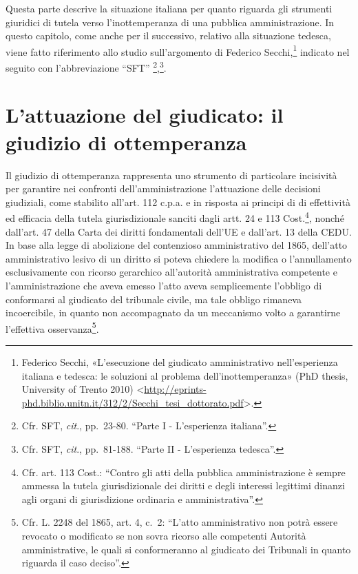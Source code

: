 \documentclass[12pt,it,a4paper,]{report}
\begin{document}
Questa parte descrive la situazione italiana per quanto riguarda gli
strumenti giuridici di tutela verso l'inottemperanza di una pubblica
amministrazione. In questo capitolo, come anche per il successivo,
relativo alla situazione tedesca, viene fatto riferimento allo studio
sull'argomento di Federico Secchi,\footnote{Federico Secchi,
  {«L'esecuzione del giudicato amministrativo nell'esperienza italiana e
  tedesca: le soluzioni al problema dell'inottemperanza»} (PhD thesis,
  University of Trento 2010)
  \textless{}\url{http://eprints-phd.biblio.unitn.it/312/2/Secchi_tesi_dottorato.pdf}\textgreater.}
indicato nel seguito con l'abbreviazione ``SFT''
\footnote{Cfr. SFT, \emph{cit}., pp.~23-80. ``Parte I - L'esperienza
  italiana''.},\footnote{Cfr. SFT, \emph{cit}., pp.~81-188. ``Parte II -
  L'esperienza tedesca''.}.

\hypertarget{lattuazione-del-giudicato-il-giudizio-di-ottemperanza}{%
\section{L'attuazione del giudicato: il giudizio di
ottemperanza}\label{lattuazione-del-giudicato-il-giudizio-di-ottemperanza}}

Il giudizio di ottemperanza rappresenta uno strumento di particolare
incisività per garantire nei confronti dell'amministrazione l'attuazione
delle decisioni giudiziali, come stabilito all'art. 112 c.p.a. e in
risposta ai principi di di effettività ed efficacia della tutela
giurisdizionale sanciti dagli artt. 24 e 113 Cost.\footnote{Cfr. art.
  113 Cost.: ``Contro gli atti della pubblica amministrazione è sempre
  ammessa la tutela giurisdizionale dei diritti e degli interessi
  legittimi dinanzi agli organi di giurisdizione ordinaria e
  amministrativa''.}, nonché dall'art. 47 della Carta dei diritti
fondamentali dell'UE e dall'art. 13 della CEDU. In base alla legge di
abolizione del contenzioso amministrativo del 1865, dell'atto
amministrativo lesivo di un diritto si poteva chiedere la modifica o
l'annullamento esclusivamente con ricorso gerarchico all'autorità
amministrativa competente e l'amministrazione che aveva emesso l'atto
aveva semplicemente l'obbligo di conformarsi al giudicato del tribunale
civile, ma tale obbligo rimaneva incoercibile, in quanto non
accompagnato da un meccanismo volto a garantirne l'effettiva
osservanza\footnote{Cfr. L. 2248 del 1865, art. 4, c.~2: ``L'atto
  amministrativo non potrà essere revocato o modificato se non sovra
  ricorso alle competenti Autorità amministrative, le quali si
  conformeranno al giudicato dei Tribunali in quanto riguarda il caso
  deciso''.}.
\end{document}
